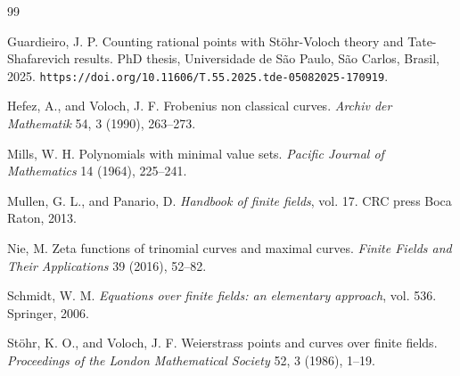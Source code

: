 \documentclass[preprint,12pt]{elsarticle}
\begin{document}
\begin{thebibliography}{99}


Guardieiro, J. P. Counting rational points with Stöhr-Voloch theory and Tate-Shafarevich results. 
PhD thesis, Universidade de São Paulo, São Carlos, Brasil, 2025. 
\texttt{https://doi.org/10.11606/T.55.2025.tde-05082025-170919}.

Hefez, A., and Voloch, J. F. Frobenius non classical curves. 
\textit{Archiv der Mathematik} 54, 3 (1990), 263--273.

Mills, W. H. Polynomials with minimal value sets. 
\textit{Pacific Journal of Mathematics} 14 (1964), 225--241.

Mullen, G. L., and Panario, D. \textit{Handbook of finite fields}, vol. 17. 
CRC press Boca Raton, 2013.

Nie, M. Zeta functions of trinomial curves and maximal curves. 
\textit{Finite Fields and Their Applications} 39 (2016), 52--82.

Schmidt, W. M. \textit{Equations over finite fields: an elementary approach}, vol. 536. 
Springer, 2006.

Stöhr, K. O., and Voloch, J. F. Weierstrass points and curves over finite fields. 
\textit{Proceedings of the London Mathematical Society} 52, 3 (1986), 1--19.


\end{thebibliography}
\end{document}
